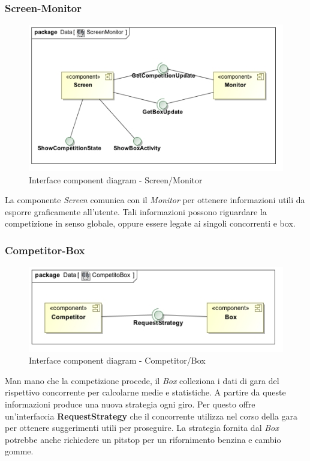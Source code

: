 \subsubsection{Screen-Monitor}
\begin{center}
\begin{figure}[h!]
	\includegraphics[scale=0.55]{img/InteractionDiagram/Implementation_Diagram__ScreenMonitor.jpg}
\caption{Interface component diagram - Screen/Monitor}
\end{figure}
\end{center}
La componente \emph{Screen} comunica con il \emph{Monitor} per ottenere informazioni utili da esporre graficamente all'utente. Tali
informazioni possono riguardare la competizione in senso globale, oppure essere legate ai singoli concorrenti e box.
\subsubsection{Competitor-Box}
\begin{center}
\begin{figure}[h!]
	\includegraphics[scale=0.55]{img/InteractionDiagram/Implementation_Diagram__CompetitoBox.jpg}
\caption{Interface component diagram - Competitor/Box}
\end{figure}
\end{center}
Man mano che la competizione procede, il \emph{Box} colleziona i dati di gara del rispettivo concorrente per calcolarne medie e statistiche. 
A partire da queste informazioni produce una nuova strategia ogni giro. Per questo offre un'interfaccia \textbf{RequestStrategy} che il concorrente
utilizza nel corso della gara per ottenere suggerimenti utili per proseguire. La strategia fornita dal \emph{Box} potrebbe anche richiedere 
un pitstop per un rifornimento benzina e cambio gomme.
